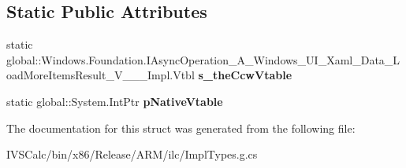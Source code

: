 \subsection*{Static Public Attributes}
\begin{DoxyCompactItemize}
\item 
\mbox{\label{struct_windows_1_1_foundation_1_1_i_async_operation___a___windows___u_i___xaml___data___load_mor4757a93b106839c8518b7060ad515b5e_aa75ccf039e3dd10fa7dfae25c3de669d}} 
static global\+::\+Windows.\+Foundation.\+I\+Async\+Operation\+\_\+\+A\+\_\+\+Windows\+\_\+\+U\+I\+\_\+\+Xaml\+\_\+\+Data\+\_\+\+Load\+More\+Items\+Result\+\_\+\+V\+\_\+\+\_\+\+\_\+\+Impl.\+Vtbl {\bfseries s\+\_\+the\+Ccw\+Vtable}
\item 
\mbox{\label{struct_windows_1_1_foundation_1_1_i_async_operation___a___windows___u_i___xaml___data___load_mor4757a93b106839c8518b7060ad515b5e_ac8da27df248639474a6805057e1b8b3d}} 
static global\+::\+System.\+Int\+Ptr {\bfseries p\+Native\+Vtable}
\end{DoxyCompactItemize}


The documentation for this struct was generated from the following file\+:\begin{DoxyCompactItemize}
\item 
I\+V\+S\+Calc/bin/x86/\+Release/\+A\+R\+M/ilc/Impl\+Types.\+g.\+cs\end{DoxyCompactItemize}
